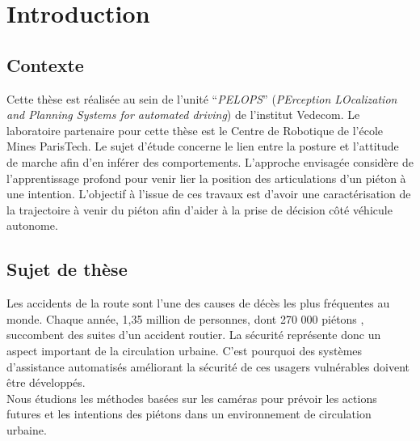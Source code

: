 \clearpage
\section{Introduction}
\label{sec:Intro}

\subsection{Contexte}
Cette thèse est réalisée au sein de l’unité “\textit{PELOPS}” (\textit{PErception LOcalization and Planning Systems for automated driving}) de l'institut Vedecom. Le laboratoire partenaire pour cette thèse est le Centre de Robotique de l'école Mines ParisTech. Le sujet d’étude concerne le lien entre la posture et l’attitude de marche afin d’en inférer des comportements. L’approche envisagée considère de l’apprentissage profond pour venir lier la position des articulations d’un piéton à une intention. L’objectif à l’issue de ces travaux est d’avoir une caractérisation de la trajectoire à venir du piéton afin d’aider à la prise de décision côté véhicule autonome.

\subsection{Sujet de thèse}
Les accidents de la route sont l'une des causes de décès les plus fréquentes au monde. Chaque année, 1,35 million de personnes, dont 270 000 piétons \cite{WinNT}, succombent des suites d'un accident routier.
La sécurité représente donc un aspect important de la circulation urbaine. C'est pourquoi des systèmes d'assistance automatisés améliorant la sécurité de ces usagers vulnérables doivent être développés.\\

Nous étudions les méthodes basées sur les caméras pour prévoir les actions futures
et les intentions des piétons dans un environnement de circulation urbaine.












